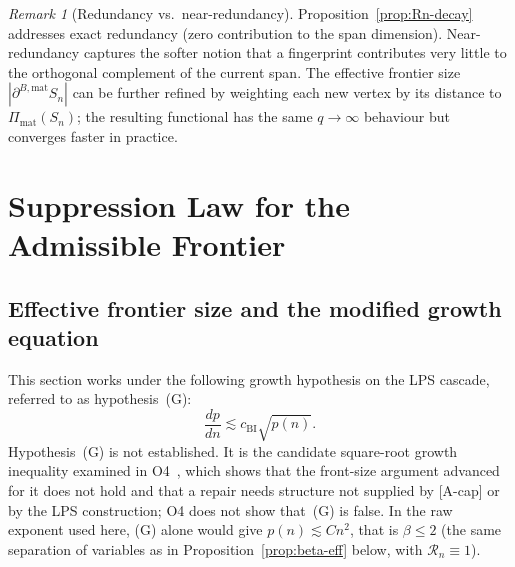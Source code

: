 \documentclass[11pt]{article}
\theoremstyle{definition}
\theoremstyle{remark}
\newtheorem{remark}[theorem]{Remark}
\newcommand{\deff}{|\partial^{B,\mathrm{mat}} S_n|}
\newcommand{\Rn}{\mathcal{R}_n}
\begin{document}
    \begin{remark}[Redundancy vs.\ near-redundancy]
      \label{rem:near-redundancy}
      Proposition~\ref{prop:Rn-decay} addresses exact redundancy (zero contribution to
      the span dimension). Near-redundancy captures the softer notion that a fingerprint
      contributes very little to the orthogonal complement of the current span.
      The effective frontier size $\deff$ can be further refined by weighting each new
      vertex by its distance to $\Pi_{\mathrm{mat}}(S_n)$; the resulting functional
      has the same $q \to \infty$ behaviour but converges faster in practice.
    \end{remark}

  \section{Suppression Law for the Admissible Frontier}
  \label{sec:suppression}

  \subsection{Effective frontier size and the modified growth equation}
    \label{ssec:effective-frontier}

    This section works under the following growth hypothesis on the LPS cascade, referred to as
    hypothesis~(G):
    \begin{equation}
      \label{eq:raw-growth}
      \frac{dp}{dn} \lesssim c_{\mathrm{BI}} \sqrt{p(n)}.
    \end{equation}
    Hypothesis~(G) is not established.
    It is the candidate square-root growth inequality examined in O4~\cite{Beau2026a8}, which shows
    that the front-size argument advanced for it does not hold and that a repair needs structure not
    supplied by [A-cap] or by the LPS construction; O4 does not show that~(G) is false.
    In the raw exponent used here, (G) alone would give $p(n) \lesssim C n^2$, that is $\beta \leq 2$
    (the same separation of variables as in Proposition~\ref{prop:beta-eff} below, with $\Rn \equiv 1$).
\end{document}
